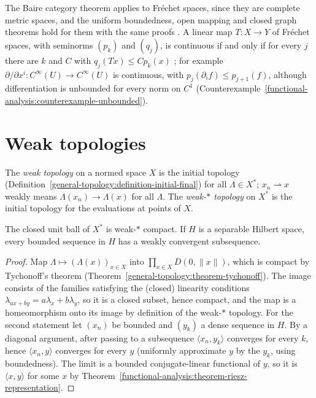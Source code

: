 The Baire category theorem applies to Fr\'echet spaces, since they are complete metric spaces, and the uniform boundedness, open mapping and closed graph theorems hold for them with the same proofs
\cite[Chapter 2]{rudin-fa}. A linear map $T \colon X \to Y$ of Fr\'echet spaces, with seminorms $(p_k)$ and $(q_j)$, is continuous if and only if for every $j$ there are $k$ and $C$ with $q_j(Tx) \leq Cp_k(x)$
\cite[Chapter 1]{rudin-fa}; for example
$\partial/\partial x^i \colon C^\infty(U) \to C^\infty(U)$ is continuous, with $p_j(\partial_if) \leq p_{j+1}(f)$, although differentiation is unbounded for every norm on $C^1$
(Counterexample~\ref{functional-analysis:counterexample-unbounded}).

\section{Weak topologies}\label{functional-analysis:section-weak}

\begin{definition}\label{functional-analysis:definition-weak}
The \emph{weak topology} on a normed space $X$ is the initial topology (Definition~\ref{general-topology:definition-initial-final}) for all $\Lambda \in X^*$; $x_n \rightharpoonup x$ weakly means
$\Lambda(x_n) \to \Lambda(x)$ for all $\Lambda$. The \emph{weak-$*$ topology} on $X^*$ is the initial topology for the evaluations at points of $X$.
\end{definition}

\begin{theorem}\label{functional-analysis:theorem-alaoglu}
The closed unit ball of $X^*$ is weak-$*$ compact. If $H$ is a separable Hilbert space, every bounded sequence in $H$ has a weakly convergent subsequence.
\end{theorem}

\begin{proof}
Map $\Lambda \mapsto (\Lambda(x))_{x \in X}$ into $\prod_{x \in X}\overline{D}(0, \|x\|)$, which is compact by Tychonoff's theorem (Theorem~\ref{general-topology:theorem-tychonoff}). The image consists of the
families satisfying the (closed) linearity conditions $\lambda_{ax+by} = a\lambda_x + b\lambda_y$, so it is a closed subset, hence compact, and the map is a homeomorphism onto its image by definition of the
weak-$*$ topology. For the second statement let $(x_n)$ be bounded and $(y_k)$ a dense sequence in $H$. By a diagonal argument, after passing to a subsequence $\langle x_n, y_k \rangle$ converges for every $k$,
hence $\langle x_n, y \rangle$ converges for every $y$ (uniformly approximate $y$ by the $y_k$, using boundedness). The limit is a bounded conjugate-linear functional of $y$, so it is $\langle x, y \rangle$ for
some $x$ by Theorem~\ref{functional-analysis:theorem-riesz-representation}.
\end{proof}

